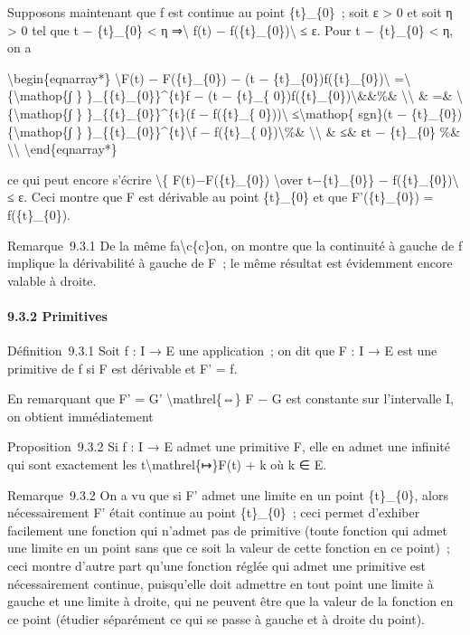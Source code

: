 \documentclass[]{article}
\begin{document}
Supposons maintenant que f est continue au point \{t\}\_\{0\}~; soit ε
\textgreater{} 0 et soit η \textgreater{} 0 tel que \textbar{}t −
\{t\}\_\{0\}\textbar{} \textless{} η ⇒\textbackslash{}\textbar{} f(t) −
f(\{t\}\_\{0\})\textbackslash{}\textbar{} ≤ ε. Pour \textbar{}t −
\{t\}\_\{0\}\textbar{} \textless{} η, on a

\textbackslash{}begin\{eqnarray*\} \textbackslash{}\textbar{}F(t) −
F(\{t\}\_\{0\}) − (t −
\{t\}\_\{0\})f(\{t\}\_\{0\})\textbackslash{}\textbar{}
=\textbackslash{}\textbar{}\{\textbackslash{}mathop\{∫ \}
\}\_\{\{t\}\_\{0\}\}\^{}\{t\}f − (t − \{t\}\_\{
0\})f(\{t\}\_\{0\})\textbackslash{}\textbar{}\&\&\%\&
\textbackslash{}\textbackslash{} \& =\&
\textbackslash{}\textbar{}\{\textbackslash{}mathop\{∫ \}
\}\_\{\{t\}\_\{0\}\}\^{}\{t\}(f − f(\{t\}\_\{
0\}))\textbackslash{}\textbar{} ≤\textbackslash{}mathop\{ sgn\}(t −
\{t\}\_\{0\})\{\textbackslash{}mathop\{∫ \}
\}\_\{\{t\}\_\{0\}\}\^{}\{t\}\textbackslash{}\textbar{}f − f(\{t\}\_\{
0\})\textbackslash{}\textbar{}\%\& \textbackslash{}\textbackslash{} \&
≤\& ε\textbar{}t − \{t\}\_\{0\}\textbar{} \%\&
\textbackslash{}\textbackslash{} \textbackslash{}end\{eqnarray*\}

ce qui peut encore s'écrire \textbackslash{}\textbar{}\{
F(t)−F(\{t\}\_\{0\}) \textbackslash{}over t−\{t\}\_\{0\}\} −
f(\{t\}\_\{0\})\textbackslash{}\textbar{} ≤ ε. Ceci montre que F est
dérivable au point \{t\}\_\{0\} et que F'(\{t\}\_\{0\}) =
f(\{t\}\_\{0\}).

Remarque~9.3.1 De la même fa\textbackslash{}c\{c\}on, on montre que la
continuité à gauche de f implique la dérivabilité à gauche de F~; le
même résultat est évidemment encore valable à droite.

\paragraph{9.3.2 Primitives}

Définition~9.3.1 Soit f : I → E une application~; on dit que F : I → E
est une primitive de f si F est dérivable et F' = f.

En remarquant que F' = G' \textbackslash{}mathrel\{⇔\} F − G est
constante sur l'intervalle I, on obtient immédiatement

Proposition~9.3.2 Si f : I → E admet une primitive F, elle en admet une
infinité qui sont exactement les t\textbackslash{}mathrel\{↦\}F(t) + k
où k ∈ E.

Remarque~9.3.2 On a vu que si F' admet une limite en un point
\{t\}\_\{0\}, alors nécessairement F' était continue au point
\{t\}\_\{0\}~; ceci permet d'exhiber facilement une fonction qui n'admet
pas de primitive (toute fonction qui admet une limite en un point sans
que ce soit la valeur de cette fonction en ce point)~; ceci montre
d'autre part qu'une fonction réglée qui admet une primitive est
nécessairement continue, puisqu'elle doit admettre en tout point une
limite à gauche et une limite à droite, qui ne peuvent être que la
valeur de la fonction en ce point (étudier séparément ce qui se passe à
gauche et à droite du point).
\end{document}
